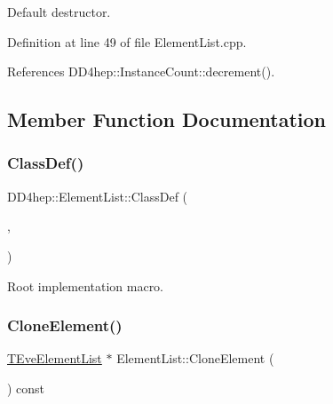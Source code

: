 Default destructor. 



Definition at line 49 of file Element\+List.\+cpp.



References D\+D4hep\+::\+Instance\+Count\+::decrement().



\subsection{Member Function Documentation}
\hypertarget{class_d_d4hep_1_1_element_list_a857af85f3fb5d9fd07519c846100f841}{}\label{class_d_d4hep_1_1_element_list_a857af85f3fb5d9fd07519c846100f841} 
\subsubsection{\texorpdfstring{Class\+Def()}{ClassDef()}}
{\footnotesize\ttfamily D\+D4hep\+::\+Element\+List\+::\+Class\+Def (\begin{DoxyParamCaption}\item[{\hyperlink{class_d_d4hep_1_1_element_list}{Element\+List}}]{,  }\item[{0}]{ }\end{DoxyParamCaption})}



Root implementation macro. 

\hypertarget{class_d_d4hep_1_1_element_list_a91e498a497b9d4be48504f674c864cd5}{}\label{class_d_d4hep_1_1_element_list_a91e498a497b9d4be48504f674c864cd5} 
\subsubsection{\texorpdfstring{Clone\+Element()}{CloneElement()}}
{\footnotesize\ttfamily \hyperlink{class_t_eve_element_list}{T\+Eve\+Element\+List} $\ast$ Element\+List\+::\+Clone\+Element (\begin{DoxyParamCaption}{ }\end{DoxyParamCaption}) const\hspace{0.3cm}{\ttfamily [virtual]}}



